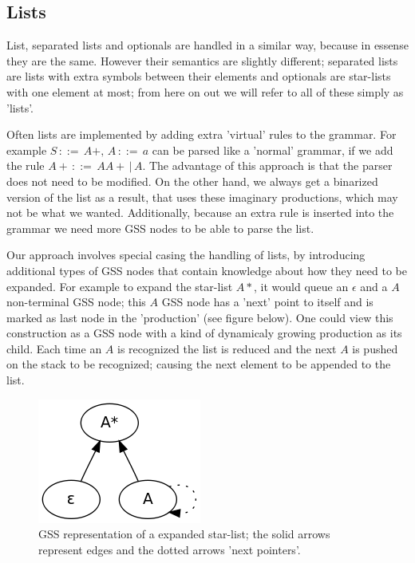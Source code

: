 \documentclass[a4paper,10pt]{article}
\begin{document}
\subsection{Lists}

List, separated lists and optionals are handled in a similar way, because in essense they are the same. However their semantics are slightly different; separated lists are lists with extra symbols between their elements and optionals are star-lists with one element at most; from here on out we will refer to all of these simply as 'lists'.

Often lists are implemented by adding extra 'virtual' rules to the grammar. For example $S\,::=\,A+,\,A\,::=\,a$ can be parsed like a 'normal' grammar, if we add the rule $A+\,::=\,AA+\,|\,A$. The advantage of this approach is that the parser does not need to be modified. On the other hand, we always get a binarized version of the list as a result, that uses these imaginary productions, which may not be what we wanted. Additionally, because an extra rule is inserted into the grammar we need more GSS nodes to be able to parse the list.

Our approach involves special casing the handling of lists, by introducing additional types of GSS nodes that contain knowledge about how they need to be expanded. For example to expand the star-list $A*$, it would queue an $\epsilon$ and a $A$ non-terminal GSS node; this $A$ GSS node has a 'next' point to itself and is marked as last node in the 'production' (see figure below). One could view this construction as a GSS node with a kind of dynamicaly growing production as its child. Each time an $A$ is recognized the list is reduced and the next $A$ is pushed on the stack to be recognized; causing the next element to be appended to the list.

\begin{figure}[H]
\centering
\includegraphics[scale=0.5]{star-list.png}
\caption{GSS representation of a expanded star-list; the solid arrows represent edges and the dotted arrows 'next pointers'.}
\end{figure}
\end{document}
